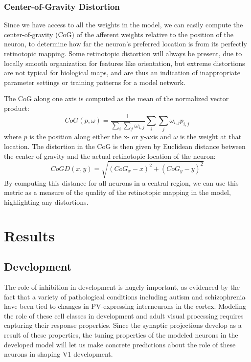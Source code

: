\subsubsection{Center-of-Gravity Distortion}

Since we have access to all the weights in the model, we can easily compute
the center-of-gravity (CoG) of the afferent weights relative to the
position of the neuron, to determine how far the neuron's preferred
location is from its perfectly retinotopic mapping.  Some retinotopic
distortion will always be present, due to locally smooth organization
for features like orientation, but extreme distortions are not typical
for biological maps, and are thus an indication of inappropriate
parameter settings or training patterns for a model network.

The CoG along one axis is computed as the mean of the normalized
vector product: 
\begin{equation}
  CoG(p, \omega) = \frac{1}{\sum_i \sum_j \omega_{i, j}} \sum_i \sum_j \omega_{i,j} p_{i,j}  
\end{equation}
where $p$ is the position along either the x- or y-axis and $\omega$
is the weight at that location. The distortion in the CoG is then
given by Euclidean distance between the center of gravity and the
actual retinotopic location of the neuron:
\begin{equation}
  CoGD(x, y) = \sqrt{(CoG_x-x)^2 + (CoG_y-y)^2}
\end{equation}
By computing this distance for all neurons in a central region, we can use
this metric as a measure of the quality of the retinotopic mapping in
the model, highlighting any distortions.

\section{Results}
\subsection{Development}

The role of inhibition in development is hugely important, as
evidenced by the fact that a variety of pathological conditions
including autism \citep{Wohr2015} and schizophrenia \citep{Lewis2012}
have been tied to changes in PV-expressing interneurons in the
cortex. Modeling the role of these cell classes in development and
adult visual processing requires capturing their response
properties. Since the synaptic projections develop as a result of these
properties, the tuning properties of the modeled neurons in the
developed model will let us make concrete predictions about the role of
these neurons in shaping V1 development.

